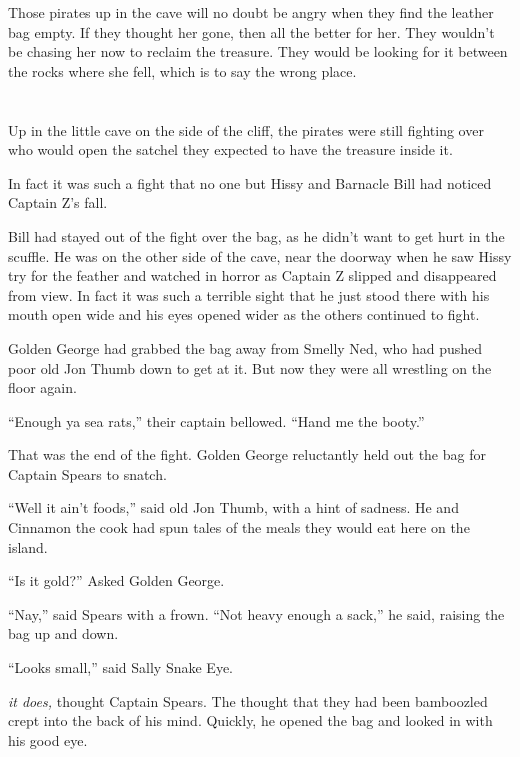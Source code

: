 \documentclass[12pt]{extbook}
\begin{document}
  Those pirates up in the cave will no doubt be angry when they find the
  leather bag empty. If they thought her gone, then all the better for
  her. They wouldn't be chasing her now to reclaim the treasure. They
  would be looking for it between the rocks where she fell, which is to
  say the wrong place.
  
  \section{}\label{section-23}
  
  Up in the little cave on the side of the cliff, the pirates were still
  fighting over who would open the satchel they expected to have the
  treasure inside it.
  
  In fact it was such a fight that no one but Hissy and Barnacle Bill had
  noticed Captain Z's fall.
  
  Bill had stayed out of the fight over the bag, as he didn't want to get
  hurt in the scuffle. He was on the other side of the cave, near the
  doorway when he saw Hissy try for the feather and watched in horror as
  Captain Z slipped and disappeared from view. In fact it was such a
  terrible sight that he just stood there with his mouth open wide and his
  eyes opened wider as the others continued to fight.
  
  Golden George had grabbed the bag away from Smelly Ned, who had pushed
  poor old Jon Thumb down to get at it. But now they were all wrestling on
  the floor again.
  
  \enquote{Enough ya sea rats,} their captain bellowed. \enquote{Hand me
  the booty.}
  
  That was the end of the fight. Golden George reluctantly held out the
  bag for Captain Spears to snatch.
  
  \enquote{Well it ain't foods,} said old Jon Thumb, with a hint of
  sadness. He and Cinnamon the cook had spun tales of the meals they would
  eat here on the island.
  
  \enquote{Is it gold?} Asked Golden George.
  
  \enquote{Nay,} said Spears with a frown. \enquote{Not heavy enough a
  sack,} he said, raising the bag up and down.
  
  \enquote{Looks small,} said Sally Snake Eye.
  
  \emph{it does,} thought Captain Spears. The thought that they had been
  bamboozled crept into the back of his mind. Quickly, he opened the bag
  and looked in with his good eye.
  
\end{document}
